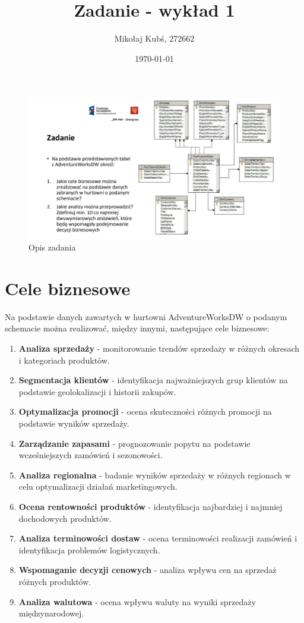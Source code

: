 \documentclass[a4paper,12pt]{article}
\title{Zadanie - wykład 1}
\author{Mikołaj Kubś, 272662}
\date{\today}
\begin{document}
\maketitle

\begin{figure}[H]
    \centering
    \includegraphics[width=1\textwidth]{images/task.png}
    \caption{Opis zadania}
\end{figure}

\section{Cele biznesowe}

Na podstawie danych zawartych w hurtowni AdventureWorksDW o podanym schemacie można realizować, między innymi, następujące cele biznesowe:

\begin{enumerate}
    \item \textbf{Analiza sprzedaży} - monitorowanie trendów sprzedaży w różnych okresach i kategoriach produktów.
    \item \textbf{Segmentacja klientów} - identyfikacja najważniejszych grup klientów na podstawie geolokalizacji i historii zakupów.
    \item \textbf{Optymalizacja promocji} - ocena skuteczności różnych promocji na podstawie wyników sprzedaży.
    \item \textbf{Zarządzanie zapasami} - prognozowanie popytu na podstawie wcześniejszych zamówień i sezonowości.
    \item \textbf{Analiza regionalna} - badanie wyników sprzedaży w różnych regionach w celu optymalizacji działań marketingowych.
    \item \textbf{Ocena rentowności produktów} - identyfikacja najbardziej i najmniej dochodowych produktów.
    \item \textbf{Analiza terminowości dostaw} - ocena terminowości realizacji zamówień i identyfikacja problemów logistycznych.
    \item \textbf{Wspomaganie decyzji cenowych} - analiza wpływu cen na sprzedaż różnych produktów.
    \item \textbf{Analiza walutowa} - ocena wpływu waluty na wyniki sprzedaży międzynarodowej.
\end{enumerate}
\end{document}
